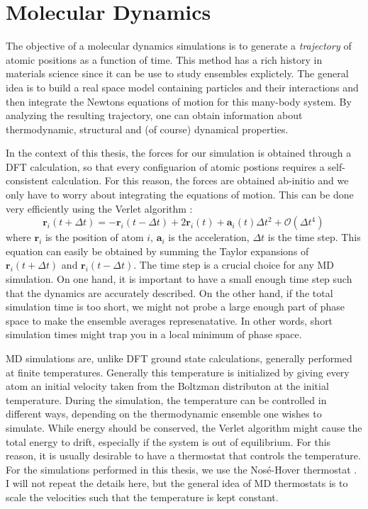 \section{Molecular Dynamics}\label{sec:method_md}
The objective of a molecular dynamics simulations is to generate a \emph{trajectory} of atomic positions as a function of time. This method has a rich history in materials science since it can be use to study ensembles explictely. The general idea is to build a real space model containing particles and their interactions and then integrate the Newtons equations of motion for this many-body system. By analyzing the resulting trajectory, one can obtain information about thermodynamic, structural and (of course) dynamical properties.

In the context of this thesis, the forces for our simulation is obtained through a DFT calculation, so that every configuarion of atomic postions requires a self-consistent calculation. For this reason, the forces are obtained ab-initio and we only have to worry about integrating the equations of motion. This can be done very efficiently using the Verlet algorithm \cite{Verlet1967}:
%
\[ \bm{r}_i(t+\Delta t) = - \bm{r}_i(t-\Delta t) + 2 \bm{r}_i(t) + \bm{a}_i (t) \Delta t^2 + \mathcal{O}(\Delta t^4) \, \]
%
where $\bm{r}_i$ is the position of atom $i$, $\bm{a}_i$ is the acceleration, $\Delta t$ is the time step. This equation can easily be obtained by summing the Taylor expansions of $\bm{r}_i(t+\Delta t)$ and $\bm{r}_i(t-\Delta t)$. The time step is a crucial choice for any MD simulation. On one hand, it is important to have a small enough time step such that the dynamics are accurately described. On the other hand, if the total simulation time is too short, we might not probe a large enough part of phase space to make the ensemble averages represenatative. In other words, short simulation times might trap you in a local minimum of phase space.

MD simulations are, unlike DFT ground state calculations, generally performed at finite temperatures. Generally this temperature is initialized by giving every atom an initial velocity taken from the Boltzman distributon at the initial temperature. During the simulation, the temperature can be controlled in different ways, depending on the thermodynamic ensemble one wishes to simulate. While energy should be conserved, the Verlet algorithm might cause the total energy to drift, especially if the system is out of equilibrium. For this reason, it is usually desirable to have a thermostat that controls the temperature. For the simulations performed in this thesis, we use the Nos\'e-Hover thermostat \cite{Nose1984}. I will not repeat the details here, but the general idea of MD thermostats is to scale the velocities such that the temperature is kept constant.

